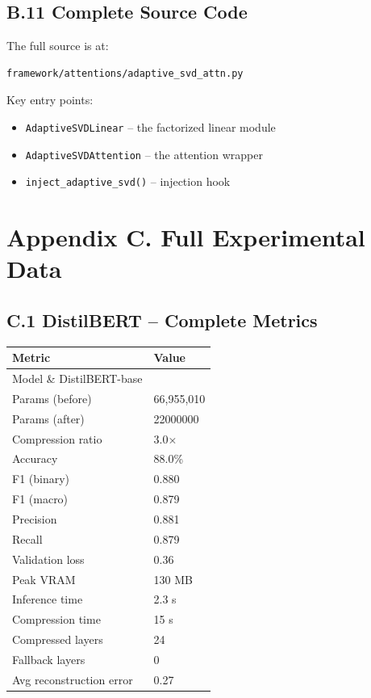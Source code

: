 \subsection{B.11 Complete Source Code}

The full source is at:

\begin{lstlisting}
framework/attentions/adaptive_svd_attn.py
\end{lstlisting}

Key entry points:
\begin{itemize}
\item \texttt{AdaptiveSVDLinear} -- the factorized linear module
\item \texttt{AdaptiveSVDAttention} -- the attention wrapper
\item \texttt{inject\_adaptive\_svd()} -- injection hook
\end{itemize}


\section{Appendix C. Full Experimental Data}

\subsection{C.1 DistilBERT -- Complete Metrics}

\begin{table}[H]
\centering
\small
\begin{tabular}{ll}
\toprule
\textbf{Metric} & \textbf{Value} \\
\midrule
Model \& DistilBERT-base \\
Params (before) & 66,955,010 \\
Params (after) & 22000000 \\
Compression ratio & 3.0$\times$ \\
Accuracy & 88.0\% \\
F1 (binary) & 0.880 \\
F1 (macro) & 0.879 \\
Precision & 0.881 \\
Recall & 0.879 \\
Validation loss & 0.36 \\
Peak VRAM & 130 MB \\
Inference time & 2.3 s \\
Compression time & 15 s \\
Compressed layers & 24 \\
Fallback layers & 0 \\
Avg reconstruction error & 0.27 \\
\bottomrule
\end{tabular}
\end{table}

